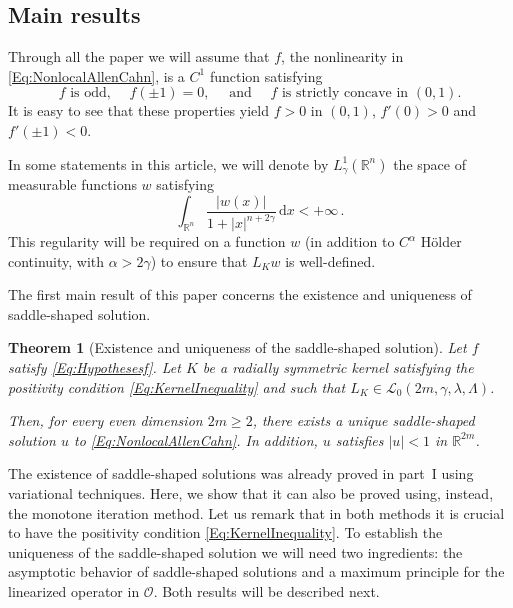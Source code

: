 \documentclass[12pt,reqno]{amsart}
\newtheorem{theorem}{Theorem}[section]
\theoremstyle{definition}
\theoremstyle{remark}
\newcommand{\con}[1]{\mathbb{#1}}
\newcommand{\R}{\con{R}} %
\newcommand{\lcal}{\mathcal{L}}
\newcommand{\ocal}{\mathcal{O}}
\newcommand{\s}{\gamma}
\renewcommand{\d}{\,\mathrm{d}} %
\numberwithin{equation}{section}
\begin{document}
\subsection{Main results}
\label{Subsec:Main results}

Through all the paper we will assume that $f$, the nonlinearity in \eqref{Eq:NonlocalAllenCahn}, is a $C^1$ function satisfying
\begin{equation}
\label{Eq:Hypothesesf}
f \textrm{ is odd, } \quad f(\pm 1)=0, \quad \text{ and } \quad f \textrm{ is strictly concave in }  (0,1).
\end{equation}
It is easy to see that these properties yield $f>0$ in $(0,1)$, $f'(0)>0$ and $f'(\pm 1) < 0$. 

In some statements in this article, we will denote by $L^1_\s(\R^n)$ the space of measurable functions $w$ satisfying
$$
\int_{\R^n} \dfrac{|w(x)|}{1+|x|^{n+2\s}}\d x < +\infty\,.
$$
This regularity will be required on a function $w$ (in addition to $C^\alpha$ Hölder continuity, with $\alpha > 2\s$) to ensure that $L_K w$ is well-defined.

The first main result of this paper concerns the existence and uniqueness of saddle-shaped solution.


\begin{theorem}[Existence and uniqueness of the saddle-shaped solution]
	\label{Th:ExistenceUniqueness}
	Let $f$ satisfy \eqref{Eq:Hypothesesf}. Let $K$ be a radially symmetric kernel satisfying the positivity condition \eqref{Eq:KernelInequality} and such that $L_K\in \lcal_0(2m, \s, \lambda, \Lambda)$. 
	
	Then, for every even dimension $2m \geq 2$, there exists a unique saddle-shaped solution $u$ to \eqref{Eq:NonlocalAllenCahn}. In addition, $u$ satisfies $|u|<1$ in $\R^{2m}$.
\end{theorem}

The existence of saddle-shaped solutions was already proved in part~I \cite{FelipeSanz-Perela:IntegroDifferentialI} using variational techniques. Here, we show that it can also be proved using, instead, the monotone iteration method. Let us remark that in both methods it is crucial to have the positivity condition \eqref{Eq:KernelInequality}. To establish the uniqueness of the saddle-shaped solution we will need two ingredients: the asymptotic behavior of saddle-shaped solutions and a maximum principle for the linearized operator in $\ocal$. Both results will be described next.
\end{document}
